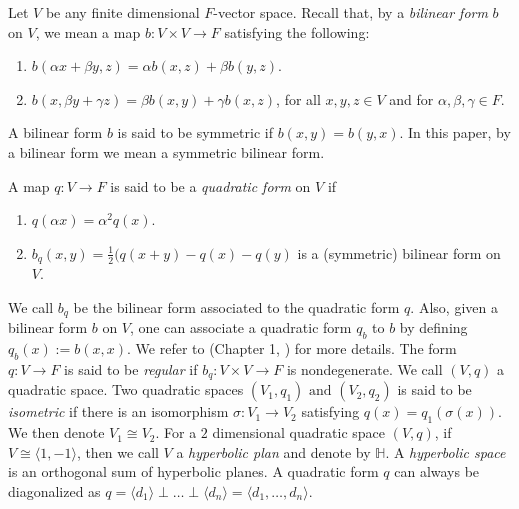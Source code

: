 \documentclass[sn-mathphys-num]{sn-jnl}%
\begin{document}

Let $V$ be any finite dimensional $F$-vector space.
Recall that, by a {\it bilinear form} $b$ on $V$, we mean a map $b: V \times V \to F$ satisfying the following: 
\begin{enumerate}

    \item $b(\alpha x+ \beta y,z)=\alpha b(x,z)+ \beta b(y,z).$
    \item $ b(x,\beta y+ \gamma z)=\beta b(x,y)+\gamma b(x,z)$, for all $x,y,z \in V$ and for $\alpha, \beta, \gamma \in F$.
\end{enumerate}
A bilinear form $b$ is said to be symmetric if $b(x,y)=b(y,x)$. In this paper, by a bilinear form we mean a symmetric bilinear form.

A map $q:V \to F$ is said to be a {\it quadratic form} on $V$ if 
\begin{enumerate}
    \item $q(\alpha x)=\alpha^2 q(x)$.
    \item $b_q(x,y)=\frac{1}{2}(q(x+y)-q(x)-q(y)$ is a (symmetric) bilinear form on $V$.
\end{enumerate}
We call $b_q$ be the bilinear form associated to the quadratic form $q$. Also, given a bilinear form $b$ on $V$, one can associate a quadratic form $q_b$ to $b$ by defining $q_b(x):= b(x,x)$.
We refer to (Chapter 1, \cite{sch}) for more details.
The form $q:V\to F$ is said to be {\it regular} if $b_q:V \times V \to F$ is nondegenerate.
We call $(V,q)$ a quadratic space. Two quadratic spaces $(V_1, q_1) \text{ and } (V_2,q_2)$ is said to be {\it isometric} if there is an isomorphism $\sigma: V_1 \to V_2$ satisfying $q(x)=q_1(\sigma(x))$. We then denote $V_1 \cong V_2$. For a $2$ dimensional quadratic space $(V,q)$, if $V \cong \langle 1,-1 \rangle $, then we call $V$ a {\it hyperbolic plan} and denote by $\mathbb{H}$. A {\it hyperbolic space} is an orthogonal sum of hyperbolic planes. A quadratic form $q$ can always be diagonalized as $q=\langle d_1\rangle \perp \dots\perp \langle d_n \rangle = \langle d_1,\dots,d_n \rangle$.
\end{document}
